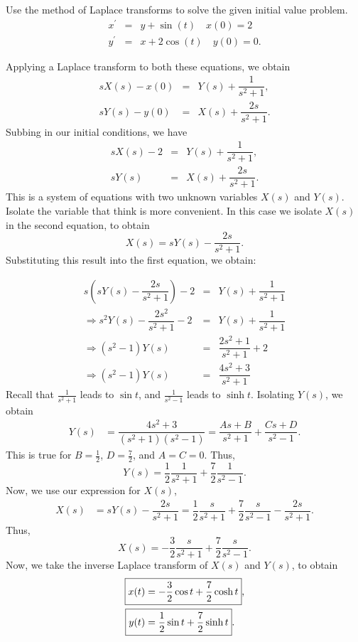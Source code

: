 \documentclass[11pt]{article}
\begin{document}
\begin{problem}
Use the method of Laplace transforms to solve the given initial value problem.
\begin{eqnarray*}
x^{\prime} & = & y + \sin(t) \quad x(0)=2 \\
y^{\prime} & = & x + 2 \cos(t) \quad y(0) = 0 .
\end{eqnarray*}
\end{problem}
\begin{solution}
Applying a Laplace transform to both these equations, we obtain
\begin{eqnarray*}
sX(s)-x(0) & = & Y(s) + \dfrac{1}{s^2+1}, \\
sY(s)-y(0) & = & X(s) + \dfrac{2s}{s^2+1}.
\end{eqnarray*}
Subbing in our initial conditions, we have
\begin{eqnarray*}
sX(s)-2 & = & Y(s) + \dfrac{1}{s^2+1}, \\
sY(s) & = & X(s) + \dfrac{2s}{s^2+1}.
\end{eqnarray*}
This is a system of equations with two unknown variables $X(s)$ and $Y(s)$. Isolate the variable that think is more convenient. In this case we isolate $X(s)$ in the second equation, to obtain
\begin{equation*}
X(s) = sY(s) -  \dfrac{2s}{s^2+1}.
\end{equation*}
Substituting this result into the first equation, we obtain:

\begin{eqnarray*}
s\left(sY(s) -  \dfrac{2s}{s^2+1}\right)-2 & = & Y(s) + \dfrac{1}{s^2+1} \\
\Rightarrow s^2Y(s) -  \dfrac{2s^2}{s^2+1}-2 & = & Y(s) + \dfrac{1}{s^2+1} \\
\Rightarrow (s^2-1)Y(s) & = & \dfrac{2s^2+1}{s^2+1} +2 \\
\Rightarrow (s^2-1)Y(s) & = & \dfrac{4s^2+3}{s^2+1}
\end{eqnarray*}
Recall that $\frac{1}{s^{2}+1}$ leads to $\sin t$, and $\frac{1}{s^{2}-1}$ leads to $\sinh t$. Isolating $Y(s)$, we obtain
\begin{align*}
Y(s) & =  \dfrac{4s^2+3}{(s^2+1)(s^{2}-1)} = \dfrac{As+B}{s^2+1}+ \dfrac{Cs+D}{s^{2}-1}.
\end{align*}
This is true for $B=\frac{1}{2}$, $D=\frac{7}{2}$, and $A=C=0$. Thus, 
\begin{equation*}
Y(s)  = \dfrac{1}{2} \dfrac{1}{s^2+1} + \dfrac{7}{2} \dfrac{1}{s^{2}-1} .
\end{equation*}
Now, we use our expression for $X(s)$,
\begin{align*}
X(s) &= sY(s) -  \dfrac{2s}{s^2+1}=\dfrac{1}{2} \dfrac{s}{s^2+1} + \dfrac{7}{2} \dfrac{s}{s^{2}-1} -  \dfrac{2s}{s^2+1}. 
\end{align*}
Thus, 
\[X(s) = -\dfrac{3}{2} \dfrac{s}{s^2+1} + \dfrac{7}{2} \dfrac{s}{s^{2}-1}.\]
Now, we take the inverse Laplace transform of $X(s)$ and $Y(s)$, to obtain
\begin{align*}
\Aboxed{x(t)&= -\frac{3}{2}\cos t +\frac{7}{2}\cosh t}, \\
\Aboxed{y(t)&= \frac{1}{2}\sin t +\frac{7}{2}\sinh t}.
\end{align*}
\end{solution}
\end{document}

